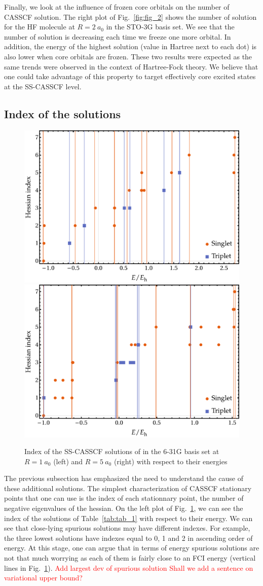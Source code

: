 \documentclass[aps,prb,reprint,showkeys,superscriptaddress]{revtex4-1}
\newcommand{\todo}[1]{\textcolor{red}{#1}}
\begin{document}
Finally, we look at the influence of frozen core orbitals on the number of CASSCF solution.
The right plot of Fig.~\ref{fig:fig_2} shows the number of solution for the HF molecule at $R=2~a_0$ in the STO-3G basis set.
We see that the number of solution is decreasing each time we freeze one more orbital.
In addition, the energy of the highest solution (value in Hartree next to each dot) is also lower when core orbitals are frozen.
These two results were expected as the same trends were observed in the context of Hartree-Fock theory. \cite{Dong_2020}
We believe that one could take advantage of this property to target effectively core excited states at the SS-CASSCF level.

\subsection{Index of the solutions}
\label{sec:geom}

\begin{figure}
  \includegraphics[width=0.4\linewidth]{Figures/fig_3a.pdf}
  \hspace{0.05\linewidth}
  \includegraphics[width=0.4\linewidth]{Figures/fig_3b.pdf}
  \caption{Index of the SS-CASSCF solutions of  in the 6-31G basis set at $R=1~a_0$ (left) and $R=5~a_0$ (right) with respect to their energies
    \label{fig:fig_3}}
\end{figure}

The previous subsection has emphasized the need to understand the cause of these additional solutions.
The simplest characterization of CASSCF stationary points that one can use is the index of each stationnary point, \ie the number of negative eigenvalues of the hessian.
On the left plot of Fig.~\ref{fig:fig_3}, we can see the index of the solutions of Table~\ref{tab:tab_1} with respect to their energy.
We can see that close-lying spurious solutions may have different indexes.
For example, the three lowest solutions have indexes equal to 0, 1 and 2 in ascending order of energy.
At this stage, one can argue that in terms of energy spurious solutions are not that much worrying as each of them is fairly close to an FCI energy (vertical lines in  Fig.~\ref{fig:fig_3}).
\todo{Add largest dev of spurious solution}
\todo{Shall we add a sentence on variational upper bound?}
\end{document}

